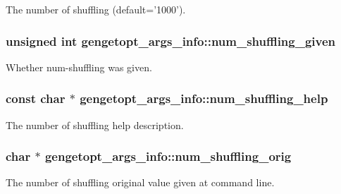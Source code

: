 The number of shuffling (default='1000'). 

\hypertarget{structgengetopt__args__info_a39aafdd42c0bbbd0cf11b6e6506aa6fe}{
\subsubsection[{num\+\_\+shuffling\+\_\+given}]{\setlength{\rightskip}{0pt plus 5cm}unsigned int gengetopt\+\_\+args\+\_\+info\+::num\+\_\+shuffling\+\_\+given}}\label{structgengetopt__args__info_a39aafdd42c0bbbd0cf11b6e6506aa6fe}


Whether num-\/shuffling was given. 

\hypertarget{structgengetopt__args__info_a8fa7a97053908512f7fb0078b95a7b8f}{
\subsubsection[{num\+\_\+shuffling\+\_\+help}]{\setlength{\rightskip}{0pt plus 5cm}const char $\ast$ gengetopt\+\_\+args\+\_\+info\+::num\+\_\+shuffling\+\_\+help}}\label{structgengetopt__args__info_a8fa7a97053908512f7fb0078b95a7b8f}


The number of shuffling help description. 

\hypertarget{structgengetopt__args__info_aca977068885436242d4094af483060d7}{
\subsubsection[{num\+\_\+shuffling\+\_\+orig}]{\setlength{\rightskip}{0pt plus 5cm}char $\ast$ gengetopt\+\_\+args\+\_\+info\+::num\+\_\+shuffling\+\_\+orig}}\label{structgengetopt__args__info_aca977068885436242d4094af483060d7}


The number of shuffling original value given at command line. 

